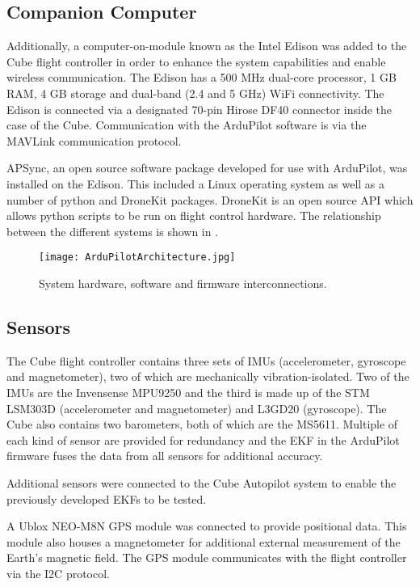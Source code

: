 \subsection{Companion Computer}
Additionally, a computer-on-module known as the Intel Edison was added to the Cube flight controller in order to enhance the system capabilities and enable wireless communication. The Edison has a 500 MHz dual-core processor, 1 GB RAM, 4 GB storage and dual-band (2.4 and 5 GHz) WiFi connectivity. The Edison is connected via a designated 70-pin Hirose DF40 connector inside the case of the Cube. Communication with the ArduPilot software is via the MAVLink communication protocol.

APSync, an open source software package developed for use with ArduPilot, was installed on the Edison. This included a Linux operating system as well as a number of python and DroneKit packages. DroneKit is an open source API which allows python scripts to be run on flight control hardware. The relationship between the different systems is shown in .

\begin{figure}[htb]
\begin{center}
	\texttt{[image: ArduPilotArchitecture.jpg]}%
	\end{center}
	\caption{System hardware, software and firmware interconnections.}%
	\label{fig:ArduArch}
\end{figure}

\FloatBarrier
\subsection{Sensors}
The Cube flight controller contains three sets of IMUs (accelerometer, gyroscope and magnetometer), two of which are mechanically vibration-isolated. Two of the IMUs are the Invensense MPU9250 and the third is made up of the STM LSM303D (accelerometer and magnetometer) and L3GD20 (gyroscope). The Cube also contains two barometers, both of which are the MS5611. Multiple of each kind of sensor are provided for redundancy and the EKF in the ArduPilot firmware fuses the data from all sensors for additional accuracy.

Additional sensors were connected to the Cube Autopilot system to enable the previously developed EKFs to be tested.  

A Ublox NEO-M8N GPS module was connected to provide positional data. This module also houses a magnetometer for additional external measurement of the Earth's magnetic field. The GPS module communicates with the flight controller via the I2C protocol.


